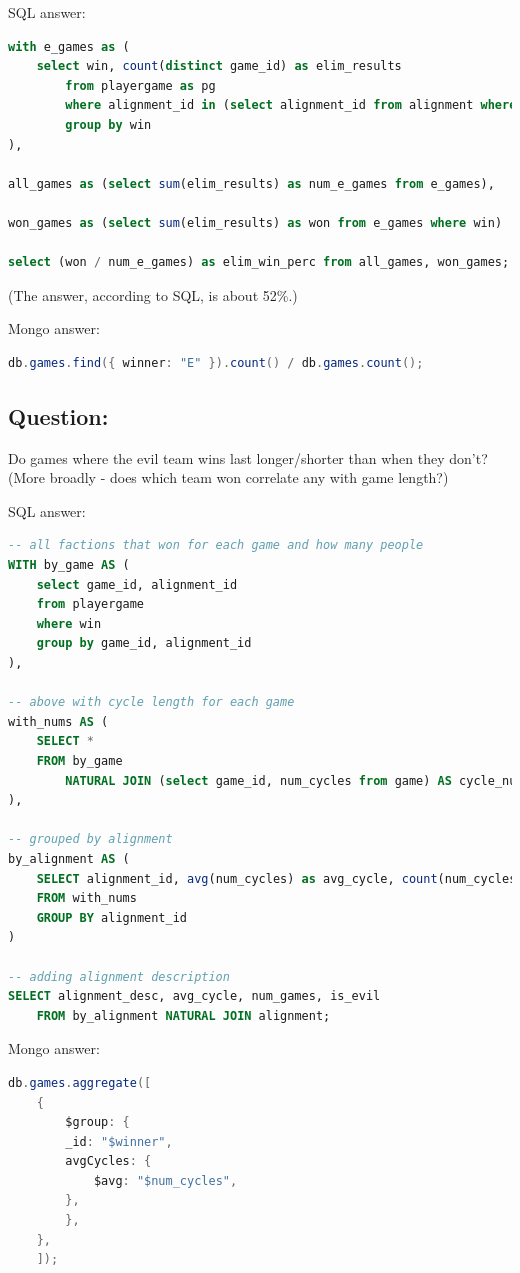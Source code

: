 \documentclass[11pt, oneside]{amsart}   	%
\begin{document}
SQL answer:
\begin{lstlisting}[language=SQL]
with e_games as (
    select win, count(distinct game_id) as elim_results
        from playergame as pg
        where alignment_id in (select alignment_id from alignment where is_elim)
        group by win
),

all_games as (select sum(elim_results) as num_e_games from e_games),

won_games as (select sum(elim_results) as won from e_games where win)

select (won / num_e_games) as elim_win_perc from all_games, won_games;
\end{lstlisting}
(The answer, according to SQL, is about 52\%.)

Mongo answer:
\begin{lstlisting}[language=java]
db.games.find({ winner: "E" }).count() / db.games.count();
\end{lstlisting}

\subsection{Question:} Do games where the evil team wins last longer/shorter than when they don't? (More broadly - does which team won correlate any with game length?)

SQL answer:
\begin{lstlisting}[language=SQL]
-- all factions that won for each game and how many people 
WITH by_game AS (
    select game_id, alignment_id
    from playergame
    where win
    group by game_id, alignment_id
),

-- above with cycle length for each game
with_nums AS (
    SELECT * 
    FROM by_game 
        NATURAL JOIN (select game_id, num_cycles from game) AS cycle_nums
), 

-- grouped by alignment
by_alignment AS (
    SELECT alignment_id, avg(num_cycles) as avg_cycle, count(num_cycles) as num_games
    FROM with_nums 
    GROUP BY alignment_id
)

-- adding alignment description
SELECT alignment_desc, avg_cycle, num_games, is_evil 
    FROM by_alignment NATURAL JOIN alignment;
\end{lstlisting}


Mongo answer:
\begin{lstlisting}[language=java]
db.games.aggregate([
    {
        $group: {
        _id: "$winner",
        avgCycles: {
            $avg: "$num_cycles",
        },
        },
    },
    ]);
\end{lstlisting}
\end{document}
